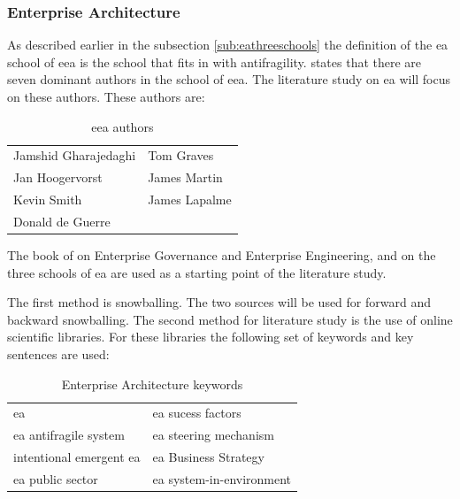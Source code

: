 \subsubsection{Enterprise Architecture}
\label{subsub:enterprisearchitecture}
As described earlier in the subsection \ref{sub:eathreeschools} the definition of the \acrfull{ea} school of \acrfull{eea} is the school that fits in with \gls{antifragility}. \textcite[p. 42]{Lapalme2012} states that there are seven dominant authors in the school of \acrshort{eea}.  The literature study on \acrshort{ea} will focus on these authors. These authors are:

\begin{table}[H]
	\centering
	\begin{tabular}{p{}p{}}
		\toprule
		Jamshid Gharajedaghi & Tom Graves \\%
		Jan Hoogervorst	& James Martin \\%
		Kevin Smith & James Lapalme\\%
		Donald de Guerre &  \\%
		\bottomrule
	\end{tabular}
	\caption{\acrshort{eea} authors}
	\label{tab:eeaauthors}
\end{table}

The book of \textcite{Hoogervorst2009a} on Enterprise Governance and Enterprise Engineering, and \textcite{Lapalme2012} on the three schools of \acrshort{ea} are used as a starting point of the literature study. 

The first method is snowballing. The two sources will be used for forward and backward snowballing. The second method for literature study is the use of online scientific libraries. For these libraries the following set of keywords and key sentences are used:

\begin{table}[H]
	\centering
\begin{tabular}{p{}p{}}
	\toprule
	\acrlong{ea} & \acrlong{ea} sucess factors\\%
	\acrlong{ea} \gls{antifragile} system	& \acrlong{ea} steering mechanism\\%
	intentional emergent \acrlong{ea} & \acrlong{ea} Business Strategy\\%
	\acrlong{ea} public sector & \acrlong{ea} system-in-environment \\%
	\bottomrule
\end{tabular}
	\caption{Enterprise Architecture keywords}
	\label{tab:enterprisearchitecturekeywords}
\end{table}

